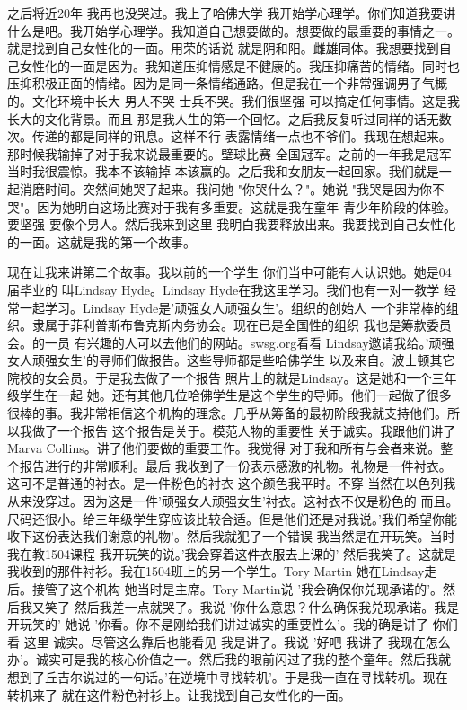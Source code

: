 之后将近20年 我再也没哭过。我上了哈佛大学 我开始学心理学。你们知道我要讲什么是吧。我开始学心理学。我知道自己想要做的。想要做的最重要的事情之一。就是找到自己女性化的一面。用荣的话说 就是阴和阳。雌雄同体。我想要找到自己女性化的一面是因为。我知道压抑情感是不健康的。我压抑痛苦的情绪。同时也压抑积极正面的情绪。因为是同一条情绪通路。但是我在一个非常强调男子气概的。文化环境中长大 男人不哭 士兵不哭。我们很坚强 可以搞定任何事情。这是我长大的文化背景。而且 那是我人生的第一个回忆。之后我反复听过同样的话无数次。传递的都是同样的讯息。这样不行 表露情绪一点也不爷们。我现在想起来。那时候我输掉了对于我来说最重要的。壁球比赛 全国冠军。之前的一年我是冠军 当时我很震惊。我本不该输掉 本该赢的。之后我和女朋友一起回家。我们就是一起消磨时间。突然间她哭了起来。我问她 "你哭什么？"。她说 "我哭是因为你不哭"。因为她明白这场比赛对于我有多重要。这就是我在童年 青少年阶段的体验。要坚强 要像个男人。然后我来到这里 我明白我要释放出来。我要找到自己女性化的一面。这就是我的第一个故事。 

现在让我来讲第二个故事。我以前的一个学生 你们当中可能有人认识她。她是04届毕业的 叫Lindsay Hyde。Lindsay Hyde在我这里学习。我们也有一对一教学 经常一起学习。Lindsay Hyde是'顽强女人顽强女生'。组织的创始人 一个非常棒的组织。隶属于菲利普斯布鲁克斯内务协会。现在已是全国性的组织 我也是筹款委员会。的一员 有兴趣的人可以去他们的网站。swsg.org看看 Lindsay邀请我给。'顽强女人顽强女生'的导师们做报告。这些导师都是些哈佛学生 以及来自。波士顿其它院校的女会员。于是我去做了一个报告 照片上的就是Lindsay。这是她和一个三年级学生在一起 她。还有其他几位哈佛学生是这个学生的导师。他们一起做了很多很棒的事。我非常相信这个机构的理念。几乎从筹备的最初阶段我就支持他们。所以我做了一个报告 这个报告是关于。模范人物的重要性 关于诚实。我跟他们讲了Marva Collins。讲了他们要做的重要工作。我觉得 对于我和所有与会者来说。整个报告进行的非常顺利。最后 我收到了一份表示感激的礼物。礼物是一件衬衣。这可不是普通的衬衣。是一件粉色的衬衣 这个颜色我平时。不穿 当然在以色列我从来没穿过。因为这是一件'顽强女人顽强女生'衬衣。这衬衣不仅是粉色的 而且。尺码还很小。给三年级学生穿应该比较合适。但是他们还是对我说。'我们希望你能收下这份表达我们谢意的礼物'。然后我就犯了一个错误 我当然是在开玩笑。当时我在教1504课程 我开玩笑的说。'我会穿着这件衣服去上课的' 然后我笑了。这就是我收到的那件衬衫。我在1504班上的另一个学生。Tory Martin 她在Lindsay走后。接管了这个机构 她当时是主席。Tory Martin说 '我会确保你兑现承诺的'。然后我又笑了 然后我差一点就哭了。我说 '你什么意思？什么确保我兑现承诺。我是开玩笑的' 她说 '你看。你不是刚给我们讲过诚实的重要性么'。我的确是讲了 你们看 这里 诚实。尽管这么靠后也能看见 我是讲了。我说 '好吧 我讲了 我现在怎么办'。诚实可是我的核心价值之一。然后我的眼前闪过了我的整个童年。然后我就想到了丘吉尔说过的一句话。'在逆境中寻找转机'。于是我一直在寻找转机。现在转机来了 就在这件粉色衬衫上。让我找到自己女性化的一面。 


